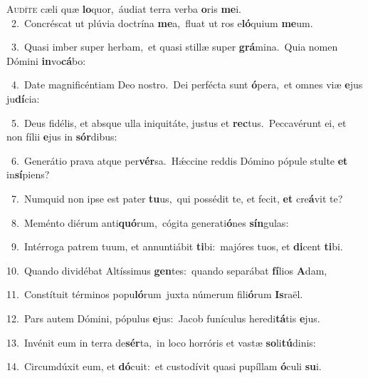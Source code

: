 \lettrine{\initial\textcolor{\initialcolor}{A}}{udíte} cæli quæ \textbf{lo}\-quor,~\star áudiat terra verba \textbf{o}\-ris \textbf{me}\-i.\\
{\numbfont\textcolor{\numbcolor}{~2.}}~Concréscat ut plúvia doctrína \textbf{me}\-a,~\star fluat ut ros e\-\textbf{ló}\-quium \textbf{me}\-um.\par
{\numbfont\textcolor{\numbcolor}{~3.}}~Quasi imber super herbam,~\dagger et quasi stillæ super \textbf{grá}\-mina.~\star Quia nomen Dómini \textbf{in}\-vo\-\textbf{cá}\-bo:\par
{\numbfont\textcolor{\numbcolor}{~4.}}~Date magnificéntiam Deo nostro.~\dagger Dei perfécta sunt \textbf{ó}\-pera,~\star et omnes viæ \textbf{e}\-jus ju\-\textbf{dí}\-cia:\par
{\numbfont\textcolor{\numbcolor}{~5.}}~Deus fidélis, et absque ulla iniquitáte, justus et \textbf{rec}\-tus.~\star Peccavérunt ei, et non fílii \textbf{e}\-jus in \textbf{sór}\-dibus:\par
{\numbfont\textcolor{\numbcolor}{~6.}}~Generátio prava atque per\-\textbf{vér}\-sa.~\star Hǽccine reddis Dómino pópule stulte \textbf{et} in\-\textbf{sí}\-piens?\par
{\numbfont\textcolor{\numbcolor}{~7.}}~Numquid non ipse est pater \textbf{tu}\-us,~\star qui possédit te, et fecit, \textbf{et} cre\-\textbf{á}\-vit te?\par
{\numbfont\textcolor{\numbcolor}{~8.}}~Meménto diérum anti\-\textbf{quó}\-rum,~\star cógita generati\-\textbf{ó}\-nes \textbf{sín}\-gulas:\par
{\numbfont\textcolor{\numbcolor}{~9.}}~Intérroga patrem tuum, et annuntiábit \textbf{ti}\-bi:~\star majóres tuos, et \textbf{di}\-cent \textbf{ti}\-bi.\par
{\numbfont\textcolor{\numbcolor}{10.}}~Quando dividébat Altíssimus \textbf{gen}\-tes:~\star quando separábat \textbf{fí}\-lios \textbf{A}\-dam,\par
{\numbfont\textcolor{\numbcolor}{11.}}~Constítuit términos popu\-\textbf{ló}\-rum~\star juxta númerum fili\-\textbf{ó}\-rum \textbf{Is}\-raël.\par
{\numbfont\textcolor{\numbcolor}{12.}}~Pars autem Dómini, pópulus \textbf{e}\-jus:~\star Jacob funículus heredi\-\textbf{tá}\-tis \textbf{e}\-jus.\par
{\numbfont\textcolor{\numbcolor}{13.}}~Invénit eum in terra de\-\textbf{sér}\-ta,~\star in loco horróris et vastæ \textbf{so}\-li\-\textbf{tú}\-dinis:\par
{\numbfont\textcolor{\numbcolor}{14.}}~Circumdúxit eum, et \textbf{dó}\-cuit:~\star et custodívit quasi pupíllam \textbf{ó}\-culi \textbf{su}\-i.\par
